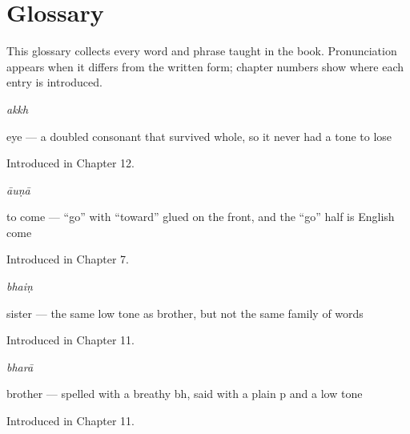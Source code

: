 
\chapter*{Glossary}

This glossary collects every word and phrase taught in the book. Pronunciation appears when it differs from the written form; chapter numbers show where each entry is introduced.

\noindent\begin{minipage}[t]{\linewidth}
\raggedright
\textbf{}\enspace\emph{akkh}\par
\small eye — a doubled consonant that survived whole, so it never had a tone to lose\par
\footnotesize Introduced in Chapter 12.
\end{minipage}\par\medskip

\noindent\begin{minipage}[t]{\linewidth}
\raggedright
\textbf{}\enspace\emph{āuṇā}\par
\small to come — “go” with “toward” glued on the front, and the “go” half is English come\par
\footnotesize Introduced in Chapter 7.
\end{minipage}\par\medskip

\noindent\begin{minipage}[t]{\linewidth}
\raggedright
\textbf{}\enspace\emph{bhaiṇ}\par
\small sister — the same low tone as brother, but not the same family of words\par
\footnotesize Introduced in Chapter 11.
\end{minipage}\par\medskip

\noindent\begin{minipage}[t]{\linewidth}
\raggedright
\textbf{}\enspace\emph{bharā}\par
\small brother — spelled with a breathy bh, said with a plain p and a low tone\par
\footnotesize Introduced in Chapter 11.
\end{minipage}\par\medskip

